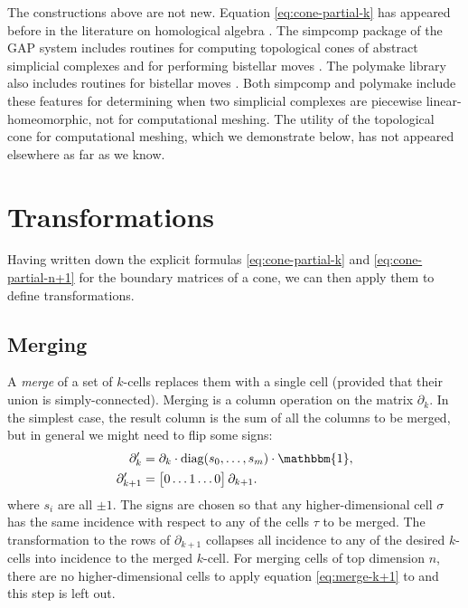 \documentclass[twocolumn]{article}
\begin{document}
The constructions above are not new.
Equation \eqref{eq:cone-partial-k} has appeared before in the literature on homological algebra \cite{gelfand1994homological}.
The simpcomp package of the GAP system includes routines for computing topological cones of abstract simplicial complexes and for performing bistellar moves \cite{bjorner2000simplicial, effenberger2011simpcomp}.
The polymake library also includes routines for bistellar moves \cite{gawrilow2000polymake}.
Both simpcomp and polymake include these features for determining when two simplicial complexes are piecewise linear-homeomorphic, not for computational meshing.
The utility of the topological cone for computational meshing, which we demonstrate below, has not appeared elsewhere as far as we know.


\section{Transformations}

Having written down the explicit formulas \eqref{eq:cone-partial-k} and \eqref{eq:cone-partial-n+1} for the boundary matrices of a cone, we can then apply them to define transformations.

\subsection{Merging}

A \emph{merge} of a set of $k$-cells replaces them with a single cell (provided that their union is simply-connected).
Merging is a column operation on the matrix $\partial_k$.
In the simplest case, the result column is the sum of all the columns to be merged, but in general we might need to flip some signs:
\begin{align}
    \partial_k' & = \partial_k\cdot\text{diag}(s_0, \ldots, s_m)\cdot\mathbbm{1}, \\
    \partial_{k + 1}' & = \left[\begin{matrix} 0 \ldots 1 \ldots 0\end{matrix}\right]\partial_{k + 1}. \label{eq:merge-k+1}
\end{align}
where $s_i$ are all $\pm 1$.
The signs are chosen so that any higher-dimensional cell $\sigma$ has the same incidence with respect to any of the cells $\tau$ to be merged.
The transformation to the rows of $\partial_{k + 1}$ collapses all incidence to any of the desired $k$-cells into incidence to the merged $k$-cell.
For merging cells of top dimension $n$, there are no higher-dimensional cells to apply equation \eqref{eq:merge-k+1} to and this step is left out.
\end{document}
